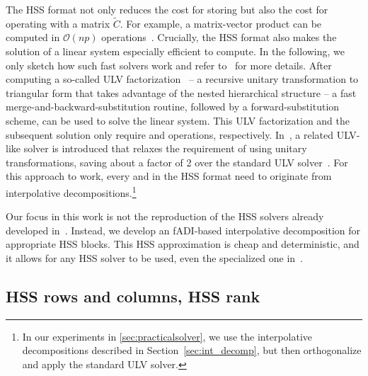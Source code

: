 The HSS format not only reduces the cost for storing but also the cost for operating with a matrix $\widetilde{C}$. For example, a matrix-vector product  can be computed in $\mathcal{O}(n p)$ operations~\cite[Alg. 1]{martinsson2011fast}.
Crucially, the HSS format also makes the solution of a linear system  especially efficient to compute. In the following, we only sketch how such fast solvers work and refer to~\cite{chandrasekaran2006fast,xia2012superfast} for more details. After computing a so-called ULV factorization~\cite{chandrasekaran2006fast} -- a recursive unitary transformation to triangular form that takes advantage of the nested hierarchical structure -- a fast merge-and-backward-substitution routine, followed by a forward-substitution scheme, can be used to solve the linear system. This ULV factorization and the subsequent solution only require  and  operations, respectively.  In~\cite{xia2012superfast},  a related ULV-like solver is introduced that relaxes the requirement of  using unitary transformations, saving about a factor of 2 over the standard ULV solver~\cite[Sec.~3.6]{xia2012superfast}. For this approach to work, every  and  in the HSS format need to originate from interpolative decompositions.\footnote{In our experiments in \cref{sec:practicalsolver}, we use the interpolative decompositions described in Section~\ref{sec:int_decomp}, but then orthogonalize and apply the standard ULV solver.}

Our focus in this work is not the reproduction of the HSS solvers already developed in~\cite{chandrasekaran2007superfast, martinsson2011fast, xia2012superfast}. Instead, we develop an fADI-based interpolative decomposition for appropriate HSS blocks. This HSS approximation is cheap and deterministic, and it allows for any HSS solver to be used, even the specialized one in~\cite{xia2012superfast}.

\subsection{HSS rows and columns, HSS rank}
\label{sec:HSSrowscols}


